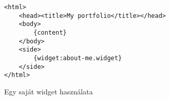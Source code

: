 \documentclass[a4paper,10pt]{article}
\begin{document}
\begin{figure}[h]
	\begin{center}
		\begin{lstlisting}
<html>
	<head><title>My portfolio</title></head>
	<body>
		{content}
	</body>
	<side>
		{widget:about-me.widget}
	</side>
</html>
		\end{lstlisting}
		\caption{Egy saját widget használata}
		\label{fig:widget}
	\end{center}
\end{figure}
\end{document}
